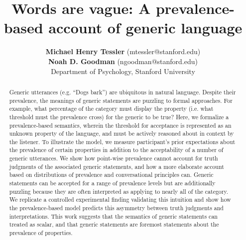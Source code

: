 \documentclass[10pt,letterpaper]{article}
\title{Words are vague: A prevalence-based account of generic language}
\author{{\large \bf Michael Henry Tessler} (mtessler@stanford.edu)\\ {\large \bf Noah D. Goodman} (ngoodman@stanford.edu) \\
  Department of Psychology, Stanford University}
\begin{document}
\maketitle


\begin{abstract}
Generic utterances (e.g. ``Dogs bark'') are ubiquitous in natural language. Despite their prevalence, the meanings of generic statements are puzzling to formal approaches. For example, what percentage of the category must display the property (i.e. what threshold must the prevalence cross) for the generic to be true? Here, we formalize a prevalence-based semantics, wherein the threshold for acceptance is represented as an unknown property of the language, and must be actively reasoned about in context by the listener. To illustrate the model, we measure participant's prior expectations about the prevalence of certain properties in addition to the acceptability of a number of generic utterances. We show how point-wise prevalence cannot account for truth judgments of the associated generic statements, and how a more elaborate account based on distributions of prevalence and conversational principles can. Generic statements can be accepted for a range of prevalence levels but are additionally puzzling because they are often interpreted as applying to nearly all of the category. We replicate a controlled experimental finding validating this intuition and show how the prevalence-based model predicts this asymmetry between truth judgments and interpretations. This work suggests that the semantics of generic statements can treated as scalar, and that generic statements are foremost statements about the prevalence of properties.


\end{abstract}
\end{document}
